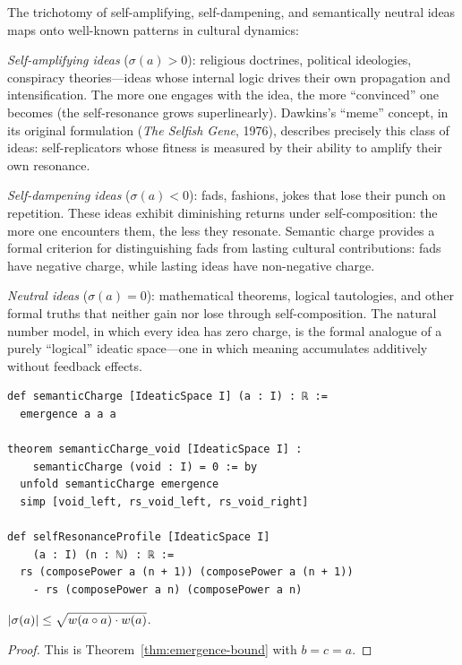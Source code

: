\begin{remark}\label{rem:ch3:charge_cultural}
The trichotomy of self-amplifying, self-dampening, and semantically neutral
ideas maps onto well-known patterns in cultural dynamics:

\emph{Self-amplifying ideas} ($\sigma(a) > 0$): religious doctrines,
political ideologies, conspiracy theories---ideas whose internal logic
drives their own propagation and intensification. The more one engages
with the idea, the more ``convinced'' one becomes (the self-resonance
grows superlinearly). Dawkins's ``meme'' concept, in its original
formulation (\emph{The Selfish Gene}, 1976), describes precisely this
class of ideas: self-replicators whose fitness is measured by their
ability to amplify their own resonance.

\emph{Self-dampening ideas} ($\sigma(a) < 0$): fads, fashions, jokes
that lose their punch on repetition. These ideas exhibit diminishing
returns under self-composition: the more one encounters them, the less
they resonate. Semantic charge provides a formal criterion for
distinguishing fads from lasting cultural contributions: fads have
negative charge, while lasting ideas have non-negative charge.

\emph{Neutral ideas} ($\sigma(a) = 0$): mathematical theorems, logical
tautologies, and other formal truths that neither gain nor lose
through self-composition. The natural number model, in which every
idea has zero charge, is the formal analogue of a purely ``logical''
ideatic space---one in which meaning accumulates additively without
feedback effects.
\end{remark}

\begin{lstlisting}[language=Lean4, caption={Semantic charge and its
properties in Lean 4}]
def semanticCharge [IdeaticSpace I] (a : I) : ℝ :=
  emergence a a a

theorem semanticCharge_void [IdeaticSpace I] :
    semanticCharge (void : I) = 0 := by
  unfold semanticCharge emergence
  simp [void_left, rs_void_left, rs_void_right]

def selfResonanceProfile [IdeaticSpace I]
    (a : I) (n : ℕ) : ℝ :=
  rs (composePower a (n + 1)) (composePower a (n + 1))
    - rs (composePower a n) (composePower a n)
\end{lstlisting}

\begin{theorem}\label{thm:charge-bound}
$|\sigma(a)| \leq \sqrt{w(a \circ a) \cdot w(a)}$.
\end{theorem}
\begin{proof}
This is Theorem~\ref{thm:emergence-bound} with $b = c = a$.
\end{proof}


